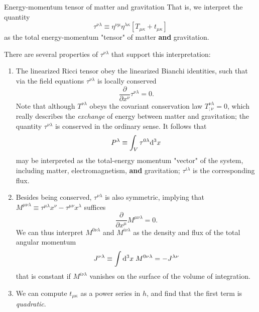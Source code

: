 	\begin{mybox}{Energy-momentum tensor of matter and gravitation}
		That is, we interpret the quantity
		\begin{equation}
		\label{eq:totalenergymomentumtensorGravityAndMatter}
			\tau^{\nu \lambda} \equiv \eta^{\nu \mu} \eta^{\lambda \kappa} \left[T_{\mu \kappa} + t_{\mu \kappa}\right]
		\end{equation}
		as the total energy-momentum "tensor" of matter \textbf{and} gravitation. 
\end{mybox}
There are several properties of $\tau^{\nu \lambda}$ that support this interpretation:
\begin{enumerate}
	\item The linearized Ricci tensor obey the linearized Bianchi identities, such that via the field equations $\tau^{\nu \lambda}$ is locally conserved
	\begin{equation}
		\frac{\partial}{\partial x^\nu} \tau^{\nu \lambda} = 0.
	\end{equation}
	Note that although $T^{\nu \lambda}$ obeys the covariant conservation law $T^{\nu \lambda}_{;\nu}=0$, which really describes the \emph{exchange} of energy between matter and gravitation; the quantity $\tau^{\nu \lambda}$ is conserved in the ordinary sense. It follows that
	\begin{equation}
		P^\lambda \equiv \int_V \tau^{0 \lambda} \mathrm{d}^3 x
	\end{equation}
	may be interpreted as the total-energy momentum "vector" of the system, including matter, electromagnetism, \textbf{and} gravitation; $\tau^{i \lambda}$ is the corresponding flux.
	\item Besides being conserved, $\tau^{\nu \lambda}$ is also symmetric, implying that $M^{\mu \nu \lambda} \equiv \tau^{\mu \lambda} x^\nu - \tau^{\mu \nu} x^\lambda$ suffices
	\begin{equation}
		\frac{\partial}{\partial x^\mu} M^{\mu \nu \lambda} = 0.
	\end{equation}
	We can thus interpret $M^{0\nu\lambda}$ and $M^{i \nu \lambda}$ as the density and flux of the total angular momentum
	\begin{equation}
		J^{\nu \lambda} \equiv \int \mathrm{d}^3 x \; M^{0 \nu \lambda} = - J^{\lambda \nu}
	\end{equation}
	that is constant if $M^{i \nu \lambda}$ vanishes on the surface of the volume of integration.
	\item We can compute $t_{\mu \kappa}$ as a power series in $h$, and find that the first term is \emph{quadratic}.\\

\end{enumerate}
